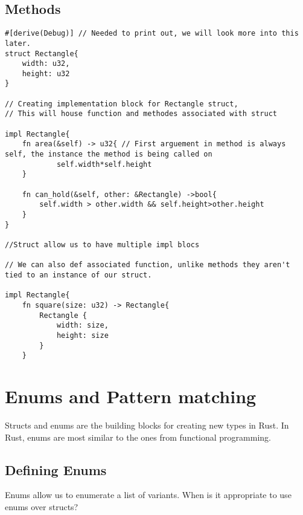 \subsection{Methods}
\begin{lstlisting}
#[derive(Debug)] // Needed to print out, we will look more into this later.
struct Rectangle{
    width: u32,
    height: u32
}

// Creating implementation block for Rectangle struct,
// This will house function and methodes associated with struct

impl Rectangle{
    fn area(&self) -> u32{ // First arguement in method is always self, the instance the method is being called on
            self.width*self.height
    }

    fn can_hold(&self, other: &Rectangle) ->bool{
        self.width > other.width && self.height>other.height
    }
}

//Struct allow us to have multiple impl blocs

// We can also def associated function, unlike methods they aren't tied to an instance of our struct.

impl Rectangle{
    fn square(size: u32) -> Rectangle{
        Rectangle { 
            width: size, 
            height: size 
        }
    }
\end{lstlisting}

\section{Enums and Pattern matching}
Structs and enums are the building blocks for creating new types in Rust. In Rust, enums are most similar to the ones from functional programming.

\subsection{Defining Enums}
Enums allow us to enumerate a list of variants. When is it appropriate to use enums over structs?

